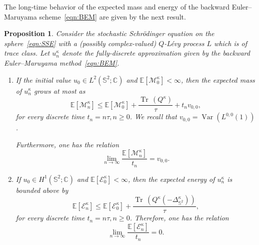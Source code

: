 \documentclass[11pt]{amsart}
\newtheorem{proposition}[theorem]{Proposition}
\newcommand{\IC}{\mathbb{C}}
\newcommand{\E}{{\mathbb E}}
\newcommand{\IS}{\mathbb{S}}
\newcommand{\tr}{{\operatorname{Tr}\, }}
\newcommand{\cE}{\mathcal E}
\newcommand{\cM}{\mathcal M}
\newcommand{\Deltalb}{\Delta_{\IS^2}}
\DeclareMathOperator{\Var}{Var}
\begin{document}
The long-time behavior of the expected mass and energy of the backward Euler--Maruyama scheme~\eqref{eqn:BEM} are given by the next result.
\begin{proposition}
    \label{prop:semi_BEM}
    Consider the stochastic Schrödinger equation on the sphere~\eqref{eqn:SSE} with a (possibly complex-valued) $Q$-L\'evy process $L$ which is of trace class.
    Let $u^\kappa_n$ denote the fully-discrete approximation given by the backward Euler--Maruyama method~\eqref{eqn:BEM}.
    \begin{enumerate}[label=\roman*)]
    \item If the initial value $u_0 \in {L^2(\IS^2; \IC)}$ and $\E\left[\cM^\kappa_0\right] < \infty$, then the expected mass of $u^\kappa_n$ grows at most as
    \begin{equation}\label{eqn:mass_BEM_bound}
        \E\left[\cM^\kappa_n\right] \leq \E\left[\cM^\kappa_0\right] + \frac{\tr(Q^\kappa)}{\tau} + t_n v_{0,0},
    \end{equation}
    for every discrete time $t_n = n\tau, n\geq 0$. We recall that $v_{0,0} = \Var\left(L^{0, 0}(1)\right)$.

    Furthermore, one has the relation
    \begin{equation}\label{eqn:mass_BEM_limit}
        \lim_{n\rightarrow\infty} \frac{\E\left[\cM^\kappa_n\right]}{t_n}  = v_{0,0}.
    \end{equation}
     \item If $u_0 \in {H^1(\IS^2; \IC)}$ and $\E\left[\cE^\kappa_0\right] < \infty$, then the expected energy of $u^\kappa_n$ is bounded above by
    \begin{equation}\label{eqn:SSE_energy_BEM_bound}
        \E\left[\cE^\kappa_n\right] \leq \E\left[\cE^\kappa_0\right] + \frac{\tr\left(Q^\kappa(-\Deltalb^\kappa)\right)}{\tau},
    \end{equation}
    for every discrete time $t_n = n\tau, n\geq 0$. Therefore, one has the relation
    \begin{equation}\label{eqn:SSE_energy_BEM_limit}
        \lim_{n\rightarrow\infty} \frac{\E\left[\cE^\kappa_n\right]}{t_n}  = 0.
    \end{equation}
 \end{enumerate}
\end{proposition}
\end{document}
